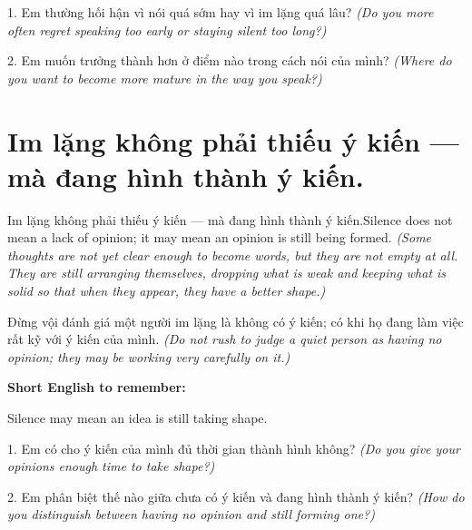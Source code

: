 \begin{tuhocnhanh}
1. Em thường hối hận vì nói quá sớm hay vì im lặng quá lâu? \textit{(Do you more often regret speaking too early or staying silent too long?)}

2. Em muốn trưởng thành hơn ở điểm nào trong cách nói của mình? \textit{(Where do you want to become more mature in the way you speak?)}
\end{tuhocnhanh}
\ngancach


\section{Im lặng không phải thiếu ý kiến — mà đang hình thành ý kiến.}
\begin{truyen}{Im lặng không phải thiếu ý kiến — mà đang hình thành ý kiến.}{Silence does not mean a lack of opinion; it may mean an opinion is still being formed.}
\textit{(Some thoughts are not yet clear enough to become words, but they are not empty at all. They are still arranging themselves, dropping what is weak and keeping what is solid so that when they appear, they have a better shape.)}
\end{truyen}

\begin{baihoc}
Đừng vội đánh giá một người im lặng là không có ý kiến; có khi họ đang làm việc rất kỹ với ý kiến của mình.
\textit{(Do not rush to judge a quiet person as having no opinion; they may be working very carefully on it.)}
\end{baihoc}

\begin{ghinhoanh}
\textbf{Short English to remember:}

Silence may mean an idea is still taking shape.

\end{ghinhoanh}

\begin{tuhocnhanh}
1. Em có cho ý kiến của mình đủ thời gian thành hình không? \textit{(Do you give your opinions enough time to take shape?)}

2. Em phân biệt thế nào giữa chưa có ý kiến và đang hình thành ý kiến? \textit{(How do you distinguish between having no opinion and still forming one?)}
\end{tuhocnhanh}
\ngancach


